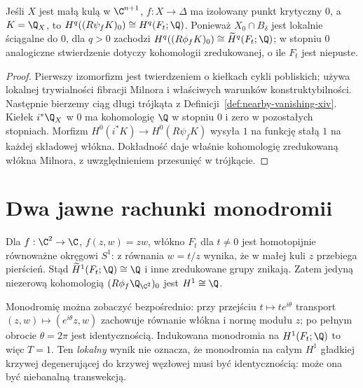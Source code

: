 \begin{stwierdzenie}
\label{prop:milnor-stalk-xiv}
Jeśli $X$ jest małą kulą w $\C^{n+1}$,
$f:X\to\Delta$ ma izolowany punkt krytyczny $0$,
a $K=\Q_X$, to
$H^q((R\psi_fK)_0)\cong H^q(F_t;\Q)$.
Ponieważ $X_0\cap B_\delta$ jest lokalnie
ściągalne do $0$, dla $q>0$ zachodzi
$H^q((R\phi_fK)_0)\cong\widetilde H^q(F_t;\Q)$;
w stopniu $0$ analogiczne stwierdzenie dotyczy
kohomologii zredukowanej, o ile $F_t$ jest niepuste.
\end{stwierdzenie}
\begin{proof}
Pierwszy izomorfizm jest twierdzeniem o kiełkach
cykli pobliskich; używa lokalnej trywialności
fibracji Milnora i właściwych warunków
konstruktybilności. Następnie bierzemy
ciąg długi trójkąta z
Definicji~\ref{def:nearby-vanishing-xiv}.
Kiełek $i^*\Q_X$ w $0$ ma kohomologię $\Q$
w stopniu $0$ i zero w pozostałych stopniach.
Morfizm $H^0(i^*K)\to H^0(R\psi_fK)$
wysyła $1$ na funkcję stałą $1$ na każdej
składowej włókna. Dokładność daje właśnie
kohomologię zredukowaną włókna Milnora,
z uwzględnieniem przesunięć w trójkącie.
\end{proof}

\section{Dwa jawne rachunki monodromii}
\begin{przyklad}[Węzeł płaski $f(z,w)=zw$]
\label{ex:node-monodromy-xiv}
Dla $f:\C^2\to\C$, $f(z,w)=zw$, włókno
$F_t$ dla $t\ne0$ jest homotopijnie równoważne
okręgowi $S^1$: z równania $w=t/z$ wynika,
że w małej kuli $z$ przebiega pierścień.
Stąd $\widetilde H^1(F_t;\Q)\cong\Q$
i inne zredukowane grupy znikają.
Zatem jedyną niezerową kohomologią
$(R\phi_f\Q_{\C^2})_0$ jest $H^1\cong\Q$.

Monodromię można zobaczyć bezpośrednio:
przy przejściu $t\mapsto te^{i\theta}$
transport $(z,w)\mapsto(e^{i\theta}z,w)$
zachowuje równanie włókna i normę modułu $z$;
po pełnym obrocie $\theta=2\pi$ jest identycznością.
Indukowana monodromia na $H^1(F_t;\Q)$ to więc $T=1$.
Ten \emph{lokalny} wynik nie oznacza, że monodromia
na całym $H^1$ gładkiej krzywej degenerującej
do krzywej węzłowej musi być identycznością:
może ona być niebanalną transwekcją.
\end{przyklad}

